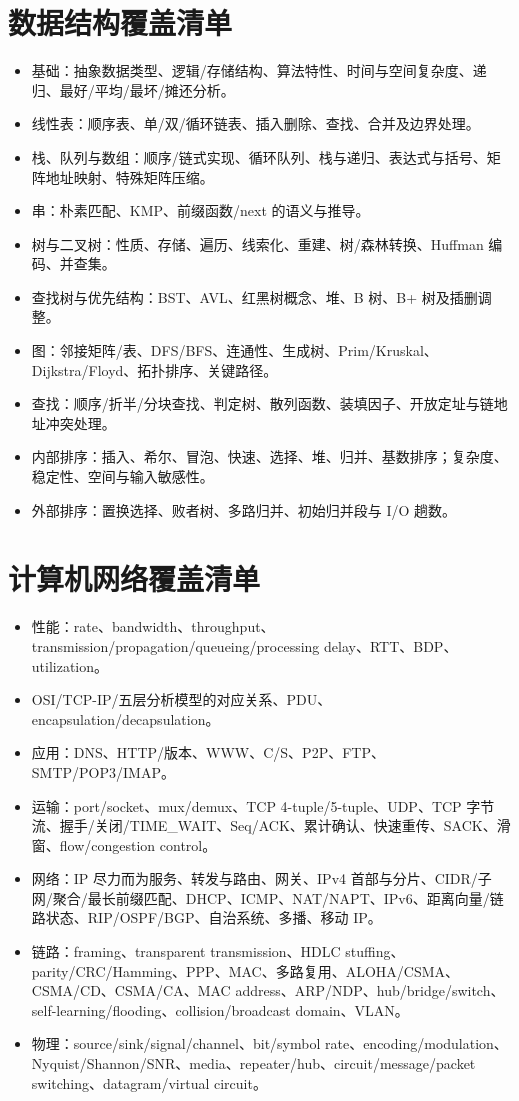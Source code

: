 \documentclass[11pt,a4paper,openany]{ctexbook}
\begin{document}
\section{数据结构覆盖清单}
\begin{itemize}
  \item 基础：抽象数据类型、逻辑/存储结构、算法特性、时间与空间复杂度、递归、最好/平均/最坏/摊还分析。
  \item 线性表：顺序表、单/双/循环链表、插入删除、查找、合并及边界处理。
  \item 栈、队列与数组：顺序/链式实现、循环队列、栈与递归、表达式与括号、矩阵地址映射、特殊矩阵压缩。
  \item 串：朴素匹配、KMP、前缀函数/next 的语义与推导。
  \item 树与二叉树：性质、存储、遍历、线索化、重建、树/森林转换、Huffman 编码、并查集。
  \item 查找树与优先结构：BST、AVL、红黑树概念、堆、B 树、B+ 树及插删调整。
  \item 图：邻接矩阵/表、DFS/BFS、连通性、生成树、Prim/Kruskal、Dijkstra/Floyd、拓扑排序、关键路径。
  \item 查找：顺序/折半/分块查找、判定树、散列函数、装填因子、开放定址与链地址冲突处理。
  \item 内部排序：插入、希尔、冒泡、快速、选择、堆、归并、基数排序；复杂度、稳定性、空间与输入敏感性。
  \item 外部排序：置换选择、败者树、多路归并、初始归并段与 I/O 趟数。
\end{itemize}

\section{计算机网络覆盖清单}
\begin{itemize}
  \item 性能：rate、bandwidth、throughput、transmission/propagation/queueing/processing delay、RTT、BDP、utilization。
  \item OSI/TCP-IP/五层分析模型的对应关系、PDU、encapsulation/decapsulation。
  \item 应用：DNS、HTTP/版本、WWW、C/S、P2P、FTP、SMTP/POP3/IMAP。
  \item 运输：port/socket、mux/demux、TCP 4-tuple/5-tuple、UDP、TCP 字节流、握手/关闭/TIME\_WAIT、Seq/ACK、累计确认、快速重传、SACK、滑窗、flow/congestion control。
  \item 网络：IP 尽力而为服务、转发与路由、网关、IPv4 首部与分片、CIDR/子网/聚合/最长前缀匹配、DHCP、ICMP、NAT/NAPT、IPv6、距离向量/链路状态、RIP/OSPF/BGP、自治系统、多播、移动 IP。
  \item 链路：framing、transparent transmission、HDLC stuffing、parity/CRC/Hamming、PPP、MAC、多路复用、ALOHA/CSMA、CSMA/CD、CSMA/CA、MAC address、ARP/NDP、hub/bridge/switch、self-learning/flooding、collision/broadcast domain、VLAN。
  \item 物理：source/sink/signal/channel、bit/symbol rate、encoding/modulation、Nyquist/Shannon/SNR、media、repeater/hub、circuit/message/packet switching、datagram/virtual circuit。
\end{itemize}
\end{document}
